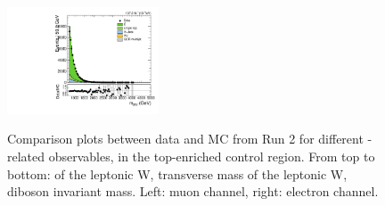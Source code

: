 \begin{figure}[htbp]
  \includegraphics[width=0.4\textwidth]{fig/controlPlots/CR_b1_e_allP_allC_allE_Run2_mWV.pdf}\\
  \caption{
    Comparison plots between data and MC from Run 2 for different \Wlep-related observables, in the top-enriched control region.
    From top to bottom: \pt of the leptonic W, transverse mass of the leptonic W, diboson invariant mass.
    Left: muon channel, right: electron channel.
    }
  \label{fig:CR_controlPlotsRun2_2}
\end{figure}

